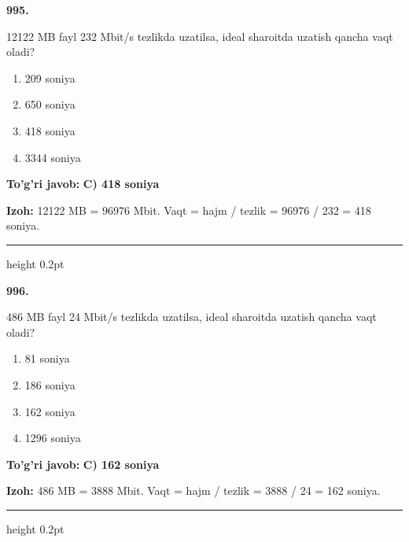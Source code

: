 \documentclass[10pt,a4paper,oneside]{article}
\begin{document}
\noindent\textbf{\color{ink}995.}
\par
12122 MB fayl 232 Mbit/s tezlikda uzatilsa, ideal sharoitda uzatish qancha vaqt oladi?
\begin{enumerate}[label=\Alph*),leftmargin=9mm]
\item 209 soniya
\item 650 soniya
\item 418 soniya
\item 3344 soniya
\end{enumerate}
\begin{tcolorbox}[enhanced,breakable,colback=teal!4,colframe=teal!50!black,boxrule=0.5pt,arc=1.1mm,left=3mm,right=3mm,top=1.7mm,bottom=1.7mm,before skip=2mm,after skip=2mm]
\textbf{\color{teal}To'g'ri javob:} \textbf{C) 418 soniya}
\par\smallskip
\textbf{Izoh:} 12122 MB = 96976 Mbit. Vaqt = hajm / tezlik = 96976 / 232 = 418 soniya.
\end{tcolorbox}
\vspace{2mm}\hrule height 0.2pt \vspace{3mm}

\noindent\textbf{\color{ink}996.}
\par
486 MB fayl 24 Mbit/s tezlikda uzatilsa, ideal sharoitda uzatish qancha vaqt oladi?
\begin{enumerate}[label=\Alph*),leftmargin=9mm]
\item 81 soniya
\item 186 soniya
\item 162 soniya
\item 1296 soniya
\end{enumerate}
\begin{tcolorbox}[enhanced,breakable,colback=teal!4,colframe=teal!50!black,boxrule=0.5pt,arc=1.1mm,left=3mm,right=3mm,top=1.7mm,bottom=1.7mm,before skip=2mm,after skip=2mm]
\textbf{\color{teal}To'g'ri javob:} \textbf{C) 162 soniya}
\par\smallskip
\textbf{Izoh:} 486 MB = 3888 Mbit. Vaqt = hajm / tezlik = 3888 / 24 = 162 soniya.
\end{tcolorbox}
\vspace{2mm}\hrule height 0.2pt \vspace{3mm}
\end{document}
